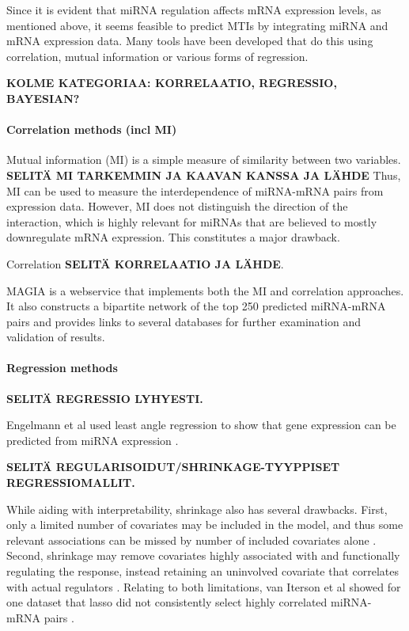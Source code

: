 Since it is evident that miRNA regulation affects mRNA expression levels, as
mentioned above, it seems feasible to predict MTIs by integrating miRNA and
mRNA expression data. Many tools have been developed that do this using
correlation, mutual information or various forms of regression.

\textbf{KOLME KATEGORIAA: KORRELAATIO, REGRESSIO, BAYESIAN?}

\paragraph{Correlation methods (incl MI)}\label{correlation-methods}

Mutual information (MI) is a simple measure of similarity between two
variables. \textbf{SELITÄ MI TARKEMMIN JA KAAVAN KANSSA JA LÄHDE} Thus, MI can
be used to measure the interdependence of miRNA-mRNA pairs from expression
data. However, MI does not distinguish the direction of the interaction, which
is highly relevant for miRNAs that are believed to mostly downregulate mRNA
expression. This constitutes a major drawback.

Correlation \textbf{SELITÄ KORRELAATIO JA LÄHDE}.

MAGIA \citep{Sales2010} is a webservice that implements both the MI and
correlation approaches. It also constructs a bipartite network of the top 250
predicted miRNA-mRNA pairs and provides links to several databases for further
examination and validation of results.



\paragraph{Regression methods}\label{regression-methods}

\textbf{SELITÄ REGRESSIO LYHYESTI.}

Engelmann et al used least angle regression to show that gene expression can
be predicted from miRNA expression \citep{Engelmann}.

\textbf{SELITÄ REGULARISOIDUT/SHRINKAGE-TYYPPISET REGRESSIOMALLIT.}

While aiding with interpretability, shrinkage also has several drawbacks.
First, only a limited number of covariates may be included in the model, and
thus some relevant associations can be missed by number of included covariates
alone \citep{vanIterson2013}. Second, shrinkage may remove covariates highly
associated with and functionally regulating the response, instead retaining an
uninvolved covariate that correlates with actual regulators \citep{Engelmann}.
Relating to both limitations, van Iterson et al showed for one dataset that
lasso did not consistently select highly correlated miRNA-mRNA pairs
\citep{vanIterson2013}.

